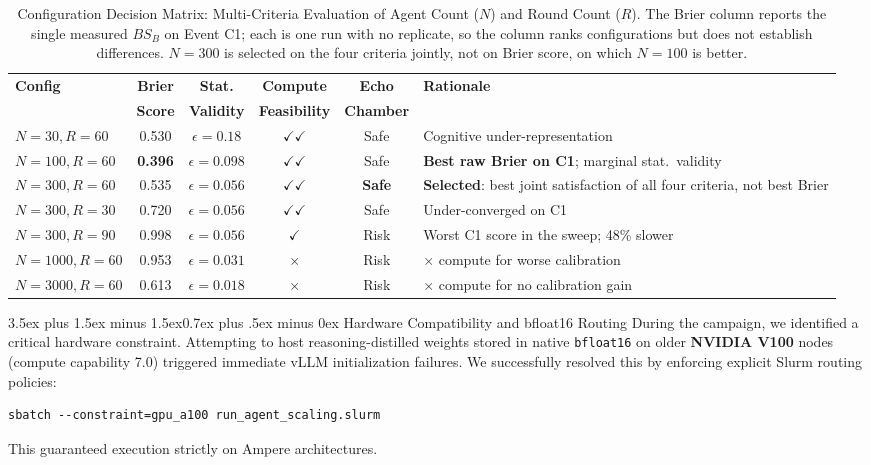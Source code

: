 \documentclass[11pt,journal,onecolumn]{IEEEtran}
\makeatletter
\renewcommand\subsection{\@startsection{subsection}{2}{\z@}%
  {3.5ex plus 1.5ex minus 1.5ex}{0.7ex plus .5ex minus 0ex}%
  {\normalfont\normalsize\bfseries}}
\makeatother
\begin{document}
\begin{table}[!htbp]
\centering
\caption{Configuration Decision Matrix: Multi-Criteria Evaluation of Agent Count ($N$) and Round Count ($R$). The Brier column reports the single measured $BS_B$ on Event C1; each is one run with no replicate, so the column ranks configurations but does not establish differences. $N=300$ is selected on the four criteria jointly, not on Brier score, on which $N=100$ is better.}
\label{tab:decision_matrix}
\small
\begin{tabular}{lcccc>{\raggedright\arraybackslash}p{6.5cm}}
\toprule
\textbf{Config} & \textbf{Brier} & \textbf{Stat.} & \textbf{Compute} & \textbf{Echo} & \textbf{Rationale} \\
 & \textbf{Score} & \textbf{Validity} & \textbf{Feasibility} & \textbf{Chamber} & \\
\midrule
$N=30, R=60$  & 0.530 & $\epsilon=0.18$ & $\checkmark\checkmark$ & Safe & Cognitive under-representation \\
$N=100, R=60$ & \textbf{0.396} & $\epsilon=0.098$ & $\checkmark\checkmark$ & Safe & \textbf{Best raw Brier on C1}; marginal stat.\ validity \\
\textbf{$N=300, R=60$} & 0.535 & $\epsilon=0.056$ & $\checkmark\checkmark$ & \textbf{Safe} & \textbf{Selected}: best joint satisfaction of all four criteria, not best Brier \\
$N=300, R=30$ & 0.720 & $\epsilon=0.056$ & $\checkmark\checkmark$ & Safe & Under-converged on C1 \\
$N=300, R=90$ & 0.998 & $\epsilon=0.056$ & $\checkmark$ & Risk & Worst C1 score in the sweep; 48\% slower \\
$N=1000, R=60$ & 0.953 & $\epsilon=0.031$ & $\times$ & Risk & 10$\times$ compute for worse calibration \\
$N=3000, R=60$ & 0.613 & $\epsilon=0.018$ & $\times$ & Risk & 100$\times$ compute for no calibration gain \\
\bottomrule
\end{tabular}
\setlength{\tabcolsep}{6pt}
\end{table}

\subsection{Hardware Compatibility and bfloat16 Routing}
During the campaign, we identified a critical hardware constraint. Attempting to host reasoning-distilled weights stored in native \texttt{bfloat16} on older \textbf{NVIDIA V100} nodes (compute capability 7.0) triggered immediate vLLM initialization failures. We successfully resolved this by enforcing explicit Slurm routing policies:
\begin{verbatim}
sbatch --constraint=gpu_a100 run_agent_scaling.slurm
\end{verbatim}
This guaranteed execution strictly on Ampere architectures.
\end{document}
